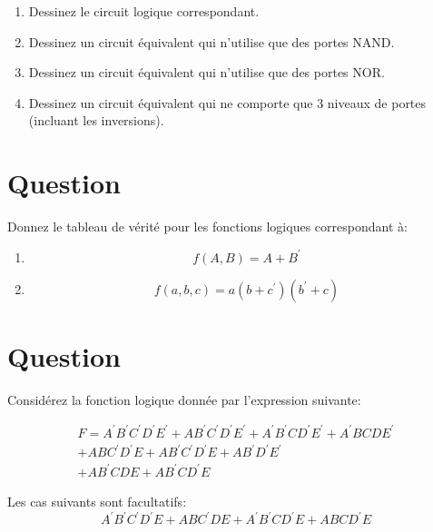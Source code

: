 \documentclass[letter, oneside]{book}
\begin{document}
\begin{enumerate}
\item Dessinez le circuit logique correspondant.

\item Dessinez un circuit équivalent qui n'utilise que des portes
NAND.

\item Dessinez un circuit équivalent qui n'utilise que des portes
NOR.

\item Dessinez un circuit équivalent qui ne comporte que 3 niveaux de
portes (incluant les inversions).
\end{enumerate}

\section*{Question}
\label{sec:org917d951}
Donnez le tableau de vérité pour les fonctions logiques correspondant
  à:

\begin{enumerate}
\item $$f(A, B) = A + B^{\prime}$$

\item $$f(a, b, c) = a(b+c^{\prime})(b^{\prime}+c)$$
\end{enumerate}

\section*{Question}
\label{sec:org6409cd4}
Considérez la fonction logique donnée par l'expression suivante:

\begin{multline*}
F = A^{\prime} B^{\prime} C^{\prime} D^{\prime} E^{\prime} + {A} B^{\prime} C^{\prime} D^{\prime} E^{\prime} + A^{\prime} B^{\prime} {C} D^{\prime} E^{\prime} + A^{\prime} {B} {C} {D} E^{\prime} \\ + {A} {B} C^{\prime} D^{\prime} {E} + {A} B^{\prime} C^{\prime} D^{\prime} {E} + {A} B^{\prime} D^{\prime} E^{\prime} \\ + {A} B^{\prime} {C} {D} {E} + {A} B^{\prime}  {C} D^{\prime} {E}
\end{multline*}

Les cas suivants sont facultatifs:
\begin{displaymath}
A^{\prime} B^{\prime} C^{\prime} D^{\prime} {E} + {A} {B} C^{\prime} {D} {E} +  A^{\prime}B^{\prime} {C} D^{\prime} {E} + {A} {B} {C} D^{\prime} {E}
\end{displaymath}
\end{document}
